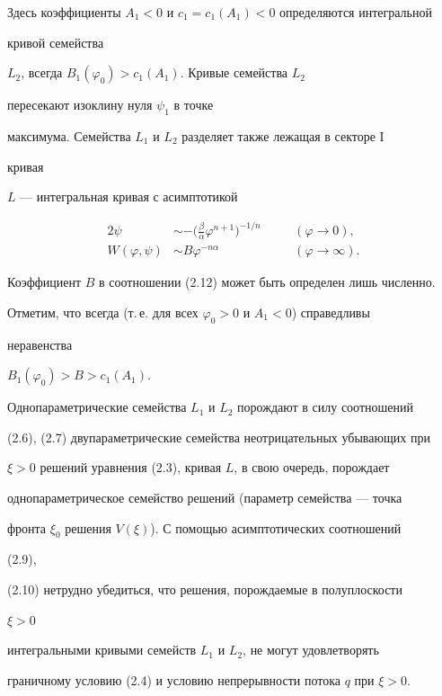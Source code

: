 Здесь коэффициенты $A_1<0$ и $c_1=c_1(A_1)<0$ определяются интегральной 


кривой семейства 


$L_2$, всегда $B_1(\varphi_0)>c_1(A_1)$. Кривые семейства $L_2$ 


пересекают изоклину нуля $\psi_1$ в точке 


максимума. Семейства $L_1$ и $L_2$ разделяет также лежащая в секторе I 


кривая 


$L$ --- интегральная кривая с асимптотикой 


\begin{alignat}{2} 


\psi&\sim -\bigg(\frac{\beta}{\alpha}\varphi^{n+1} 


\bigg)^{-1/n} &\quad &(\varphi\to0), \tag{2.11} \\ 


W(\varphi,\psi)&\sim B\varphi^{-n\alpha} &\quad 


&(\varphi\to\infty).\tag{2.12} 


\end{alignat} 


Коэффициент $B$ в соотношении (2.12) может быть определен лишь численно. 


Отметим, что всегда (т.\,е. для всех $\varphi_0>0$ и $A_1<0$) справедливы 


неравенства 


$B_1(\varphi_0)>B>c_1(A_1)$. 


 


Однопараметрические семейства $L_1$ и $L_2$ порождают в силу соотношений 


(2.6), (2.7) двупараметрические семейства неотрицательных убывающих при 


$\xi>0$ решений уравнения (2.3), кривая $L$, в свою очередь, порождает 


однопараметрическое семейство решений (параметр семейства --- точка 


фронта $\xi_0$ решения $V(\xi)$). С помощью асимптотических соотношений 


(2.9), 


(2.10) нетрудно убедиться, что решения, порождаемые в полуплоскости 


$\xi>0$ 


интегральными кривыми семейств $L_1$ и $L_2$, не могут удовлетворять 


граничному условию (2.4) и условию непрерывности потока $q$ при $\xi>0$. 


